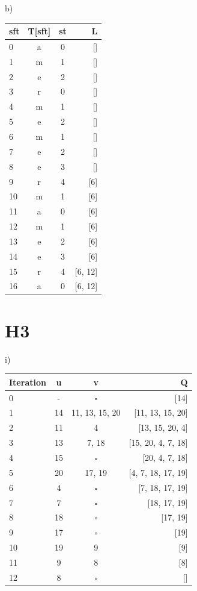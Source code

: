 \documentclass{article}
\begin{document}
\noindent b) \\ 
\begin{table}[h!]  
\begin{center}  
\begin{tabular}{|l|c|c|r|}  
    \textbf{sft} & \textbf{T[sft]} & \textbf{st} & L\\  
\hline  
    0 & a & 0 & []\\  
    1 & m & 1 & []\\  
    2 & e & 2 & []\\  
    3 & r & 0 & []\\  
    4 & m & 1 & []\\  
    5 & e & 2 & []\\  
    6 & m & 1 & []\\  
    7 & e & 2 & []\\  
    8 & e & 3 & []\\  
    9 & r & 4 & [6]\\  
    10 & m & 1 & [6]\\  
    11 & a & 0 & [6]\\  
    12 & m & 1 & [6]\\  
    13 & e & 2 & [6]\\  
    14 & e & 3 & [6]\\  
    15 & r & 4 & [6, 12]\\  
    16 & a & 0 & [6, 12]\\  
\end{tabular}  
\end{center}  
\end{table}

\newpage
\section*{H3}
\noindent i) 
\begin{table}[h!]  
\begin{center}  
\begin{tabular}{|l|c|c|r|}  
    \textbf{Iteration} & \textbf{u} & \textbf{v} & Q\\  
\hline  
    0 & - & $\square$ & [14]\\  
    1 & 14 & 11, 13, 15, 20 & [11, 13, 15, 20]\\  
    2 & 11 & 4 & [13, 15, 20, 4]\\  
    3 & 13 & 7, 18 & [15, 20, 4, 7, 18]\\  
    4 & 15 & $\square$ & [20, 4, 7, 18]\\  
    5 & 20 & 17, 19 & [4, 7, 18, 17, 19]\\ 
    6 & 4 & $\square$ & [7, 18, 17, 19]\\  
    7 & 7 & $\square$ & [18, 17, 19]\\  
    8 & 18 & $\square$ & [17, 19]\\  
    9 & 17 & $\square$ & [19]\\  
    10 & 19 & 9 & [9]\\  
    11 & 9 & 8 & [8]\\  
    12 & 8 & $\square$ & []\\  
\end{tabular}  
\end{center}  
\end{table}
\end{document}
